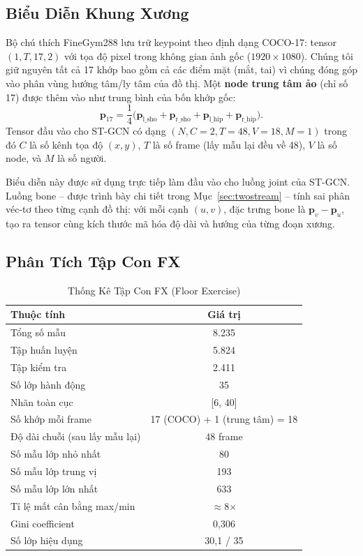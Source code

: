 \documentclass[conference]{IEEEtran}
\begin{document}
\subsection{Biểu Diễn Khung Xương}

Bộ chú thích FineGym288 lưu trữ keypoint theo định dạng COCO-17:
tensor $(1, T, 17, 2)$ với tọa độ pixel trong không gian ảnh gốc
($1920 \times 1080$). Chúng tôi giữ nguyên tất cả 17 khớp bao gồm cả
các điểm mặt (mắt, tai) vì chúng đóng góp vào phân vùng hướng
tâm/ly tâm của đồ thị. Một \textbf{node trung tâm ảo} (chỉ số 17) được
thêm vào như trung bình của bốn khớp gốc:
\[
  \mathbf{p}_{17} = \frac{1}{4}\bigl(
    \mathbf{p}_{\text{l\_sho}} + \mathbf{p}_{\text{r\_sho}} +
    \mathbf{p}_{\text{l\_hip}} + \mathbf{p}_{\text{r\_hip}}
  \bigr).
\]
Tensor đầu vào cho ST-GCN có dạng $(N, C{=}2, T{=}48, V{=}18, M{=}1)$
trong đó $C$ là số kênh tọa độ $(x, y)$, $T$ là số frame (lấy mẫu lại
đều về 48), $V$ là số node, và $M$ là số người.

Biểu diễn này được sử dụng trực tiếp làm đầu vào cho luồng joint của
ST-GCN. Luồng bone -- được trình bày chi tiết trong
Mục~\ref{sec:twostream} -- tính sai phân véc-tơ theo từng cạnh đồ thị:
với mỗi cạnh $(u, v)$, đặc trưng bone là $\mathbf{p}_v - \mathbf{p}_u$,
tạo ra tensor cùng kích thước mã hóa độ dài và hướng của từng đoạn xương.

\subsection{Phân Tích Tập Con FX}
\label{sec:eda_fx}

\begin{table}[!t]
\caption{Thống Kê Tập Con FX (Floor Exercise)}
\label{tab:fx_stats}
\centering
\begin{tabular}{lc}
\toprule
Thuộc tính & Giá trị \\
\midrule
Tổng số mẫu             & 8.235 \\
Tập huấn luyện          & 5.824 \\
Tập kiểm tra            & 2.411 \\
Số lớp hành động        & 35 \\
Nhãn toàn cục           & [6, 40] \\
Số khớp mỗi frame       & 17 (COCO) + 1 (trung tâm) = 18 \\
Độ dài chuỗi (sau lấy mẫu lại) & 48 frame \\
Số mẫu lớp nhỏ nhất     & 80 \\
Số mẫu lớp trung vị     & 193 \\
Số mẫu lớp lớn nhất     & 633 \\
Tỉ lệ mất cân bằng max/min & $\approx$8$\times$ \\
Gini coefficient        & 0,306 \\
Số lớp hiệu dụng        & 30,1 / 35 \\
\bottomrule
\end{tabular}
\end{table}
\end{document}
